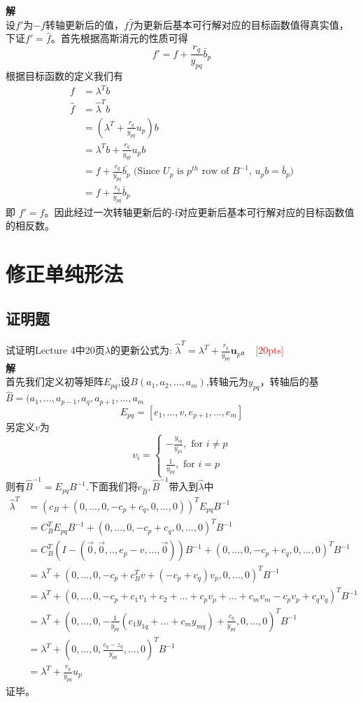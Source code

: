 \documentclass[10pt]{article}
\begin{document}
\begin{enumerate}
\begin{figure}[H]
		\label{fig.prob2}
	\end{figure}
	\textbf{解}\\
	设$f'$为$-f$转轴更新后的值，$f\hat{f}$为更新后基本可行解对应的目标函数值得真实值，下证$f'=\hat{f}$。首先根据高斯消元的性质可得
	$$f' = f + \frac{r_q}{y_{pq}}\bar{b}_p$$
	根据目标函数的定义我们有
	\begin{align*}
	f&= \lambda^Tb\\
	\hat{f} &= \hat{\lambda}^Tb\\
	&=(\lambda^T+\frac{r_q}{y_{pq}}u_p)b\\
	&=\lambda^Tb + \frac{r_q}{y_{qp}}u_pb\\
	&=f + \frac{r_q}{y_{pq}}\bar{b_p} \,\,\text{(Since $U_p$ is $p^{th}$ row of $B^{-1}$, $u_pb=\bar{b}_p$)}\\
	&=f + \frac{r_q}{y_{pq}}\bar{b}_p
	\end{align*}
	即 $f'=\hat{f}$。因此经过一次转轴更新后的-f对应更新后基本可行解对应的目标函数值的相反数。
\end{enumerate}


\section{修正单纯形法}
\subsection{证明题}
试证明Lecture 4中20页$\lambda$的更新公式为: $\hat{\lambda}^T = \lambda^T + \frac{r_q}{y_{pq}} \bm{u}_p$。~\textcolor{red}{[20pts]}\\
\textbf{解}\\
首先我们定义初等矩阵$E_{pq}$,设$B(a_1,a_2,...,a_m)$,转轴元为$y_{pq}$，转轴后的基$\hat{B} = (a_1,...,a_{p-1},a_q,a_{p+1},...,a_m$
$$E_{pq} = [e_1,...,v,e_{p+1},...,e_m]$$
另定义$v$为
$$ v_i=\left\{
\begin{aligned}
-\frac{y_{iq}}{y_{p1}}, \text{ for $i\ne p$}\\
\frac{1}{y_{pq}},\text{ for $i=p$}
\end{aligned}
\right.
$$
则有$\hat{B}^{-1}=E_{pq}B^{-1}$.下面我们将$c_{\hat{B}},\hat{B}^{-1}$带入到$\hat{\lambda}$中
\begin{align*}
\hat{\lambda}^T &= (c_B+(0,...,0,-c_p+c_q,0,...,0))^TE_{pq}B^{-1}\\
&=C_B^TE_{pq}B^{-1}+(0,...,0,-c_p+c_q,0,...,0)^TB^{-1}\\
&=C_B^T(I-(\vec{0},\vec{0},..,e_p-v,...,\vec{0}))B^{-1} + (0,...,0,-c_p+c_q,0,...,0)^TB^{-1}\\
&=\lambda^T+(0,...,0,-c_p+c_B^Tv+(-c_p+c_q)v_p,0,...,0)^TB^{-1}\\
&=\lambda^T+(0,...,0,-c_p+c_1v_1+c_2+...+c_pv_p+...+c_mv_m-c_pv_p+c_qv_q)^TB^{-1}\\
&=\lambda^T + (0,...,0,-\frac{1}{y_{pq}}(c_1y_{1q}+...+c_my_{mq})+\frac{c_q}{y_{pq}},0,...,0)^TB^{-1}\\
&=\lambda^T + (0,...,0,\frac{c_q-z_q}{y_{pq}},...,0)^TB^{-1}\\
&=\lambda^T + \frac{r_q}{y_{pq}}u_p
\end{align*}
证毕。
\end{document}
